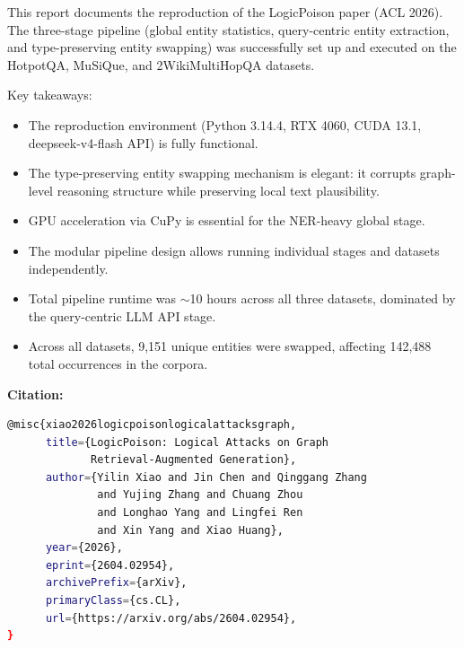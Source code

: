 \documentclass[11pt,a4paper]{article}
\begin{document}
This report documents the reproduction of the LogicPoison paper (ACL 2026).
The three-stage pipeline (global entity statistics, query-centric entity extraction,
and type-preserving entity swapping) was successfully set up and executed on the
HotpotQA, MuSiQue, and 2WikiMultiHopQA datasets.

Key takeaways:
\begin{itemize}[nosep]
  \item The reproduction environment (Python 3.14.4, RTX 4060, CUDA 13.1,
        deepseek-v4-flash API) is fully functional.
  \item The type-preserving entity swapping mechanism is elegant: it corrupts
        graph-level reasoning structure while preserving local text plausibility.
  \item GPU acceleration via CuPy is essential for the NER-heavy global stage.
  \item The modular pipeline design allows running individual stages and
        datasets independently.
  \item Total pipeline runtime was $\sim$10 hours across all three datasets,
        dominated by the query-centric LLM API stage.
  \item Across all datasets, 9,151 unique entities were swapped, affecting
        142,488 total occurrences in the corpora.
\end{itemize}

\vspace{1em}
\noindent\textbf{Citation:}
\begin{lstlisting}[language=bash]
@misc{xiao2026logicpoisonlogicalattacksgraph,
      title={LogicPoison: Logical Attacks on Graph
             Retrieval-Augmented Generation},
      author={Yilin Xiao and Jin Chen and Qinggang Zhang
              and Yujing Zhang and Chuang Zhou
              and Longhao Yang and Lingfei Ren
              and Xin Yang and Xiao Huang},
      year={2026},
      eprint={2604.02954},
      archivePrefix={arXiv},
      primaryClass={cs.CL},
      url={https://arxiv.org/abs/2604.02954},
}
\end{lstlisting}
\end{document}
